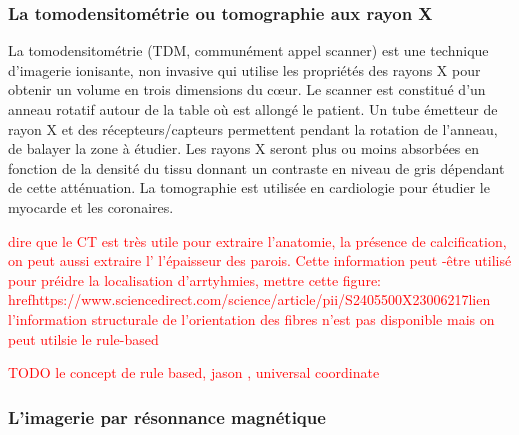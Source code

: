 \clearpage
\subsubsection{La tomodensitométrie ou tomographie aux rayon X}

La tomodensitométrie (TDM, communément appel scanner) est une technique d’imagerie ionisante, non invasive qui utilise les propriétés des rayons X pour obtenir un volume en trois dimensions du cœur. Le scanner est constitué d’un anneau rotatif autour de la table où est allongé le patient. Un tube émetteur de rayon X et des récepteurs/capteurs permettent pendant la rotation de l'anneau, de balayer la zone à étudier. Les rayons X seront plus ou moins absorbées en fonction de la densité du tissu donnant un contraste en niveau de gris dépendant de cette atténuation. La tomographie est utilisée en cardiologie pour étudier le myocarde et les coronaires. 

\textcolor{red}{dire que le CT est très utile pour extraire l'anatomie, la présence de calcification, on peut  aussi extraire l' l'épaisseur des parois. Cette information peut -être utilisé pour préidre la localisation d'arrtyhmies, mettre cette figure: href{https://www.sciencedirect.com/science/article/pii/S2405500X23006217}{lien} l'information structurale de l'orientation des fibres n'est pas disponible mais on peut utilsie le rule-based
}


\textcolor{red}{TODO le concept de rule based, jason , universal coordinate}
%



\subsubsection{L’imagerie par résonnance magnétique }

